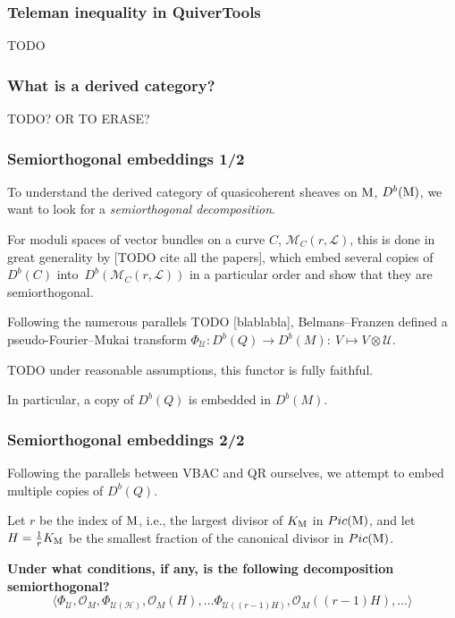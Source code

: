 \documentclass{beamer}
\begin{document}
\begin{frame}
    \frametitle{Teleman inequality in QuiverTools}
TODO
\end{frame}


\begin{frame}
    \frametitle{What is a derived category?}
TODO? OR TO ERASE?
\end{frame}
\begin{frame}
    \frametitle{Semiorthogonal embeddings 1/2}
To understand the derived category of quasicoherent sheaves on $\operatorname{M}$,
$D^b(\operatorname{M})$, we want to look for a \emph{semiorthogonal decomposition}.

For moduli spaces of vector bundles on a curve $C$, $\mathcal{M}_{C}(r, \mathcal{L})$,
this is done in great generality by
[TODO cite all the papers], which embed several copies of $D^b(C)$
into~$D^b(\mathcal{M}_{C}(r, \mathcal{L}))$ in a particular order and show
that they are semiorthogonal. \pause

Following the numerous parallels TODO [blablabla], Belmans--Franzen
defined a pseudo-Fourier--Mukai transform
$\Phi_{\mathcal{U}} : D^b(Q) \to D^b(M) :~V \mapsto V \otimes \mathcal{U}$.
\begin{theorem}
TODO under reasonable assumptions, this functor is fully faithful.
\end{theorem}
In particular, a copy of $D^b(Q)$ is embedded in $D^b(M)$. \pause
\end{frame}
\begin{frame}
    \frametitle{Semiorthogonal embeddings 2/2}
    Following the parallels between VBAC and QR ourselves,
we attempt to embed multiple copies of $D^b(Q)$. \pause

Let $r$ be the index of $\operatorname{M}$, i.e.,
the largest divisor of $K_{\operatorname{M}}$ in $Pic(\operatorname{M})$, and
let $H = \frac{1}{r}K_{\operatorname{M}}$ be the smallest fraction of the
canonical divisor in $Pic(\operatorname{M})$. \pause

\textbf{Under what conditions, if any, is the following decomposition semiorthogonal?}
\[
    \langle
    \Phi_{\mathcal{U}}, \mathcal{O}_{M},
    \Phi_{\mathcal{U(H)}}, \mathcal{O}_{M}(H), \dots
    \Phi_{\mathcal{U}((r-1)H)}, \mathcal{O}_{M}((r-1)H), \dots
    \rangle
\]

\end{frame}


\end{document}
